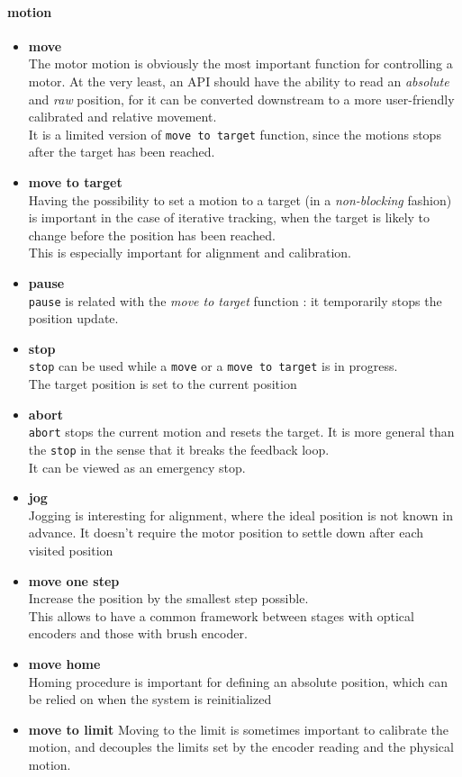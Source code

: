 \documentclass[10pt,letter,twoside]{report}
\begin{document}
			\paragraph{motion}
			\begin{itemize}	
			\item \textbf{move}\\ 
			The motor motion is obviously the most important function for controlling a motor. 
			At the very least, an API should have the ability to read an \textit{absolute} and \textit{raw} position, 
			for it can be converted downstream to a more user-friendly calibrated and relative movement.\\
			It is a limited version of \verb!move to target! function, since the motions stops after the target has been reached.
			\item \textbf{move to target}\\
			Having the possibility to set a motion to a target (in a \textit{non-blocking} fashion) is important in the case of iterative tracking, 
			when the target is likely to change before the position has been reached.\\
			This is especially important for alignment and calibration.	
			\item \textbf{pause}\\
			\verb!pause! is related with the \textit{move to target} function : it temporarily stops the position update.
			\item \textbf{stop}\\	
			\verb!stop! can be used while a \verb!move! or a \verb!move to target! is in progress.\\
			The target position is set to the current position
			\item \textbf{abort}\\
			\verb!abort! stops the current motion and resets the target. It is more general than the \verb!stop! in the sense that it breaks the feedback loop.\\
			It can be viewed as an emergency stop.
			\item \textbf{jog}\\
			Jogging is interesting for alignment, where the ideal position is not known in advance. 
			It doesn't require the motor position to settle down after each visited position
			\item \textbf{move one step}\\
			Increase the position by the smallest step possible.\\
			This allows to have a common framework between stages with optical encoders and those with brush encoder.
			\item \textbf{move home}\\
			Homing procedure is important for defining an absolute position, which can be relied on when the system is reinitialized
			\item \textbf{move to limit}
			Moving to the limit is sometimes important to calibrate the motion, and decouples the limits set by the encoder reading and the physical motion.
			\end{itemize}
\end{document}
